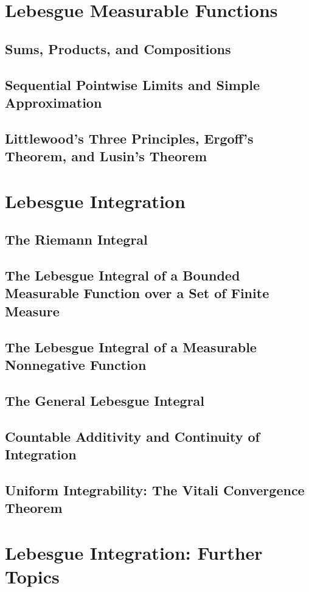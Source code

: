 \documentclass[a4paper,10pt]{book}
\theoremstyle{plain} %
\begin{document}
\chapter{Lebesgue Measurable Functions}

\section{Sums, Products, and Compositions}
\section{Sequential Pointwise Limits and Simple Approximation}
\section{Littlewood's Three Principles, Ergoff's Theorem, and Lusin's Theorem}

\chapter{Lebesgue Integration}

\section{The Riemann Integral}
\section{The Lebesgue Integral of a Bounded Measurable Function over a Set of Finite Measure}
\section{The Lebesgue Integral of a Measurable Nonnegative Function}
\section{The General Lebesgue Integral}
\section{Countable Additivity and Continuity of Integration}
\section{Uniform Integrability: The Vitali Convergence Theorem}

\chapter{Lebesgue Integration: Further Topics}
\end{document}
